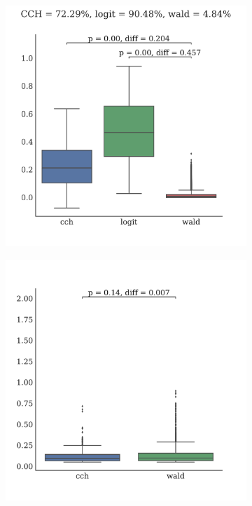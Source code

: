 \documentclass[11pt]{article}
\begin{document}
\begin{figure}
\begin{subfigure}{0.485\textwidth} \includegraphics[scale=.25]{false_positive}
\caption{} \label{fig:network-class:1}
\end{subfigure}\hfill
\begin{subfigure}{0.485\textwidth} \includegraphics[scale=.25]{false_negative}
\caption{} \label{fig:network-class:2}
\end{subfigure}


\end{figure}
\end{document}
